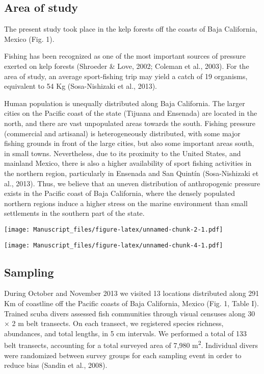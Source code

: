 \documentclass[12pt,]{article}
\begin{document}
\subsection{Area of study}\label{area-of-study}

The present study took place in the kelp forests off the coasts of Baja
California, Mexico (Fig. 1).

Fishing has been recognized as one of the most important sources of
pressure exerted on kelp forests (Shroeder \& Love, 2002; Coleman et
al., 2003). For the area of study, an average sport-fishing trip may
yield a catch of 19 organisms, equivalent to 54 Kg (Sosa-Nishizaki et
al., 2013).

Human population is unequally distributed along Baja California. The
larger cities on the Pacific coast of the state (Tijuana and Ensenada)
are located in the north, and there are vast unpopulated areas towards
the south. Fishing pressure (commercial and artisanal) is
heterogeneously distributed, with some major fishing grounds in front of
the large cities, but also some important areas south, in small towns.
Nevertheless, due to its proximity to the United States, and mainland
Mexico, there is also a higher availability of sport fishing activities
in the northern region, particularly in Ensenada and San Quintín
(Sosa-Nishizaki et al., 2013). Thus, we believe that an uneven
distribution of anthropogenic pressure exists in the Pacific coast of
Baja California, where the densely populated northern regions induce a
higher stress on the marine environment than small settlements in the
southern part of the state.

\texttt{[image: Manuscript\_files/figure-latex/unnamed-chunk-2-1.pdf]}

\texttt{[image: Manuscript\_files/figure-latex/unnamed-chunk-4-1.pdf]}

\subsection{Sampling}\label{sampling}

During October and November 2013 we visited 13 locations distributed
along 291 Km of coastline off the Pacific coasts of Baja California,
Mexico (Fig. 1, Table I). Trained scuba divers assessed fish communities
through visual censuses along 30 × 2 m belt transects. On each transect,
we registered species richness, abundances, and total lengths, in 5 cm
intervals. We performed a total of 133 belt transects, accounting for a
total surveyed area of 7,980 m\textsuperscript{2}. Individual divers
were randomized between survey groups for each sampling event in order
to reduce bias (Sandin et al., 2008).
\end{document}
